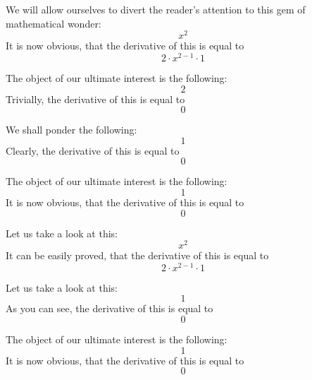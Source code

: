 \documentclass{article}
\begin{document}
We will allow ourselves to divert the reader's attention to this gem of mathematical wonder:
\begin{equation}
x ^{2 } 
\end{equation}
It is now obvious, that the derivative of this is equal to
\begin{equation}
2 \cdot x ^{2 - 1 } \cdot 1 
\end{equation}

The object of our ultimate interest is the following:
\begin{equation}
2 
\end{equation}
Trivially, the derivative of this is equal to
\begin{equation}
0 
\end{equation}

We shall ponder the following:
\begin{equation}
1 
\end{equation}
Clearly, the derivative of this is equal to
\begin{equation}
0 
\end{equation}

The object of our ultimate interest is the following:
\begin{equation}
1 
\end{equation}
It is now obvious, that the derivative of this is equal to
\begin{equation}
0 
\end{equation}

Let us take a look at this:
\begin{equation}
x ^{2 } 
\end{equation}
It can be easily proved, that the derivative of this is equal to
\begin{equation}
2 \cdot x ^{2 - 1 } \cdot 1 
\end{equation}

Let us take a look at this:
\begin{equation}
1 
\end{equation}
As you can see, the derivative of this is equal to
\begin{equation}
0 
\end{equation}

The object of our ultimate interest is the following:
\begin{equation}
1 
\end{equation}
It is now obvious, that the derivative of this is equal to
\begin{equation}
0 
\end{equation}
\end{document}
